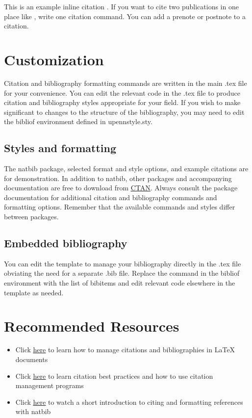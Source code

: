 This is an example inline citation \cite{heard_charles_2020}. 
If you want to cite two publications in one place like \cite{mcgoogan_chasing_2020,wright_for_2014}, write one citation command. You can add a prenote or postnote \cite[p.~78]{lake_white_1979} to a citation.

\section{Customization}
Citation and bibliography formatting commands are written in the main .tex file for your convenience. You can edit the relevant code in the .tex file to produce citation and bibliography styles appropriate for your field. If you wish to make significant to changes to the structure of the bibliography, you may need to edit the bibliof environment defined in upennstyle.sty.

\subsection{Styles and formatting}
The natbib package, selected format and style options, and example citations are for demonstration. In addition to natbib, other packages and accompanying documentation are free to download from \underline{\href{https://www.ctan.org}{CTAN}}. 
Always consult the package documentation for additional citation and bibliography commands and formatting options. Remember that the available commands and styles differ between packages.

\subsection{Embedded bibliography}
You can edit the template to manage your bibliography directly in the .tex file obviating the need for a separate .bib file. Replace the \verb|| command in the bibliof environment with the list of bibitems and edit relevant code elsewhere in the template as needed. 

\section{Recommended Resources}
\begin{itemize}
    \item Click \underline{\href{https://guides.library.upenn.edu/LaTeX/cite}{here}} to learn how to manage citations and bibliographies in LaTeX documents
    \item Click \underline{\href{https://www.library.upenn.edu/help-with/tutorials/citation-practices}{here}} to learn citation best practices and how to use citation management programs
    \item Click \underline{\href{https://mediaspace.library.upenn.edu/media/LaTeX+Fundamentals+-+6.2+Citations+\%26+Bibliographies+-+natbib/1_sxrfdv5j}{here}} to watch a short introduction to citing and formatting references with natbib
\end{itemize}